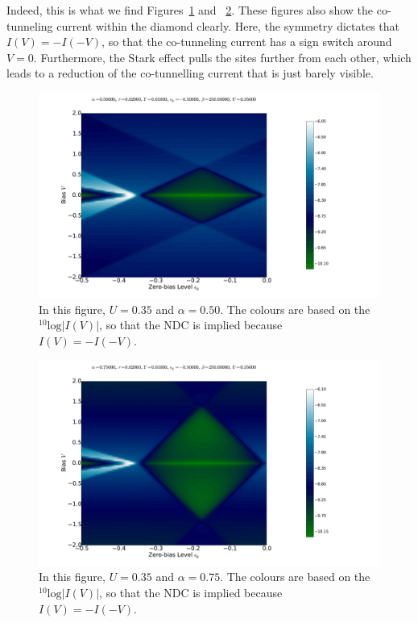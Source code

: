 Indeed, this is what we find Figures~\ref{fig:diamond50} and ~\ref{fig:diamond75}. These figures also show the co-tunneling current within the diamond clearly. Here, the symmetry dictates that $I(V)=-I(-V)$, so that the co-tunneling current has a sign switch around $V=0$. Furthermore, the Stark effect pulls the sites further from each other, which leads to a reduction of the co-tunnelling current that is just barely visible. 
\begin{figure}[htb]
    \centering
    \includegraphics[height=.38\textheight]{pdf/coulombd/current_map_diamond_alpha_05.pdf}
    \caption{In this figure, $U=0.35$ and $\alpha=0.50$. The colours are based on the $^{10}\text{log}\left|I(V)\right|$, so that the NDC is implied because $I(V) = -I(-V)$.}
    \label{fig:diamond50}
\end{figure}
\begin{figure}[htb]
    \centering
    \includegraphics[height=.38\textheight]{pdf/coulombd/current_map_diamond_alpha_075.pdf}
    \caption{In this figure, $U=0.35$ and $\alpha=0.75$. The colours are based on the $^{10}\text{log}\left|I(V)\right|$, so that the NDC is implied because $I(V) = -I(-V)$.}
    \label{fig:diamond75}
\end{figure}

